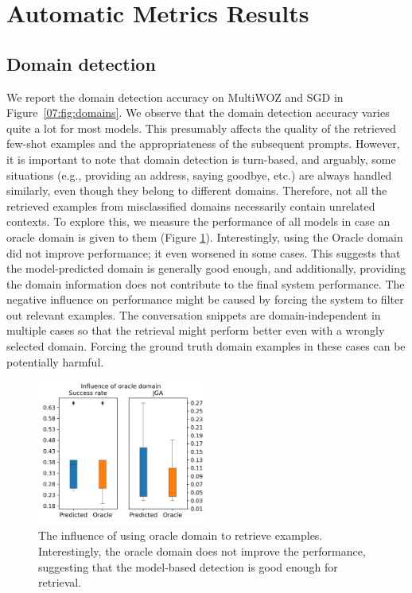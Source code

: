 \section{Automatic Metrics Results}
\label{07:sec:results}

\subsection{Domain detection}
\label{subsec:domain}
We report the domain detection accuracy on MultiWOZ and SGD
in Figure~\ref{07:fig:domains}.
We observe that the domain detection accuracy varies quite a lot for most models.
This presumably affects the quality of the retrieved few-shot examples and the appropriateness of the subsequent prompts.
However, it is important to note that domain detection is turn-based, and arguably, some situations (e.g., providing an address, saying goodbye, etc.) are always handled similarly, even though they belong to different domains.
Therefore, not all the retrieved examples from misclassified domains necessarily contain unrelated contexts.
To explore this, we measure the performance of all models in case an oracle domain is given to them (Figure \ref{fig:oracle_domains}).
Interestingly, using the Oracle domain did not improve performance; it even worsened in some cases.
This suggests that the model-predicted domain is generally good enough, and additionally, providing the domain information does not contribute to the final system performance.
The negative influence on performance might be caused by forcing the system to filter out relevant examples.
The conversation snippets are domain-independent in multiple cases so that the retrieval might perform better even with a wrongly selected domain.
Forcing the ground truth domain examples in these cases can be potentially harmful.

\begin{figure}[h]
    \centering
    \includegraphics[width=0.49\textwidth]{images/oracle_domains.png}
    \caption{The influence of using oracle domain to retrieve examples. Interestingly, the oracle domain does not improve the performance, suggesting that the model-based detection is good enough for retrieval.}
    \label{fig:oracle_domains}
\end{figure}

